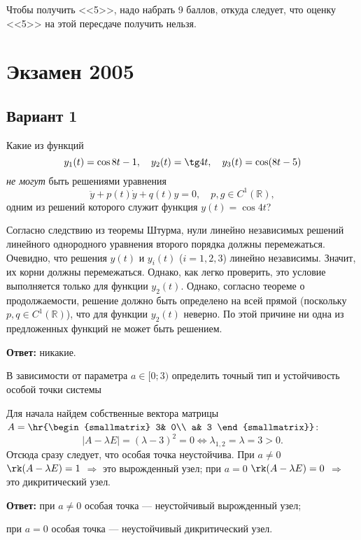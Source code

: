 \documentclass{article}
\begin{document}
\begin{note}
  Чтобы получить <<5>>, надо набрать 9 баллов, откуда следует,
  что оценку <<5>> на этой пересдаче получить нельзя.
\end{note}


\section{Экзамен 2005}

\setcounter{problem}{0}
\subsection{Вариант 1}

\begin{problem}[4 балла]
Какие из функций $$y_1(t)=\cos
8t-1,\quad y_2(t)=\tg 4t,\quad y_3(t)=\cos(8t-5)$$ \emph{не могут}
быть решениями уравнения $$\ddot{y}+p(t)\dot{y}+q(t)y=0,\quad p,g\in
C^1(\mathbb{R}),$$ одним из решений которого служит функция
$y(t)=\cos 4t$?
\end{problem}

\begin{solution}
Согласно следствию из теоремы Штурма, нули линейно
независимых решений линейного однородного уравнения второго порядка
должны перемежаться. Очевидно, что решения $y(t)$ и $y_i(t)$
($i=1,2,3$) линейно независимы. Значит, их корни должны
перемежаться. Однако, как легко проверить, это условие выполняется
только для функции $y_2(t)$. Однако, согласно теореме о
продолжаемости, решение должно быть определено на всей прямой
(поскольку $p,q\in C^1(\mathbb{R})$), что для функции $y_2(t)$
неверно. По этой причине ни одна из предложенных функций не может
быть решением.

\textbf{Ответ:} никакие.
\end{solution}

\begin{problem}[2 балла]
В зависимости от параметра $a\in[0;3)$
определить точный тип и устойчивость особой точки системы
\end{problem}
\begin{solution}
Для начала найдем собственные вектора матрицы
$A=\hr{\begin{smallmatrix} 3& 0\\ a& 3 \end{smallmatrix}}$:
$$|A-\lambda E|=(\lambda-3)^2=0\Leftrightarrow \lambda_{1,2}=\lambda=3>0.$$
Отсюда сразу следует, что особая точка неустойчива. При $a\neq 0$
$\rk(A-\lambda E)=1$ $\Rightarrow$ это вырожденный узел; при
$a= 0$ $\rk(A-\lambda E)=0$ $\Rightarrow$ это дикритический
узел.

\textbf{Ответ:} при $a\neq 0$ особая точка --- неустойчивый
вырожденный узел;

при $a= 0$ особая точка --- неустойчивый дикритический узел.
\end{solution}
\end{document}
